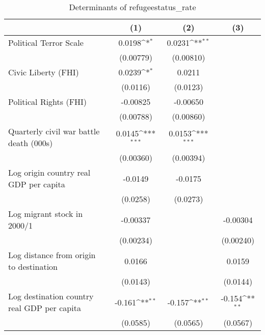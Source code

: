 \begin{table}[htbp]\centering
\def\sym#1{\ifmmode^{#1}\else\(^{#1}\)\fi}
\caption{Determinants of refugeestatus\_rate}
\begin{tabular}{l*{3}{c}}
\hline\hline
                    &\multicolumn{1}{c}{(1)}         &\multicolumn{1}{c}{(2)}         &\multicolumn{1}{c}{(3)}         \\
\hline
Political Terror Scale&      0.0198\sym{*}  &      0.0231\sym{**} &                     \\
                    &   (0.00779)         &   (0.00810)         &                     \\
[1em]
Civic Liberty (FHI) &      0.0239\sym{*}  &      0.0211         &                     \\
                    &    (0.0116)         &    (0.0123)         &                     \\
[1em]
Political Rights (FHI)&    -0.00825         &    -0.00650         &                     \\
                    &   (0.00788)         &   (0.00860)         &                     \\
[1em]
Quarterly civil war battle death (000s)&      0.0145\sym{***}&      0.0153\sym{***}&                     \\
                    &   (0.00360)         &   (0.00394)         &                     \\
[1em]
Log origin country real GDP per capita&     -0.0149         &     -0.0175         &                     \\
                    &    (0.0258)         &    (0.0273)         &                     \\
[1em]
Log migrant stock in 2000/1&    -0.00337         &                     &    -0.00304         \\
                    &   (0.00234)         &                     &   (0.00240)         \\
[1em]
Log distance from origin to destination&      0.0166         &                     &      0.0159         \\
                    &    (0.0143)         &                     &    (0.0144)         \\
[1em]
Log destination country real GDP per capita&      -0.161\sym{**} &      -0.157\sym{**} &      -0.154\sym{**} \\
                    &    (0.0585)         &    (0.0565)         &    (0.0567)         \\

\end{tabular}
\end{table}
